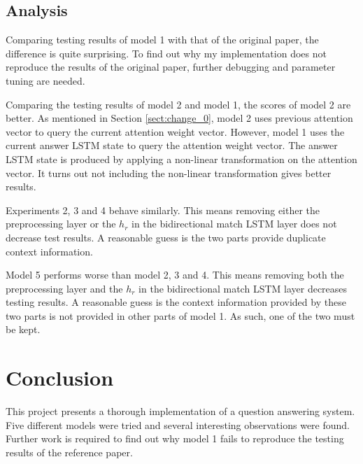 \documentclass[modernstyle,12pt]{sjsuthesis}
\theoremstyle{definition}
\begin{document}
\section{Analysis}

Comparing testing results of model 1 with that of the original paper, the difference is quite surprising. To find out why my implementation does not reproduce the results of the original paper, further debugging and parameter tuning are needed.

Comparing the testing results of model 2 and model 1, the scores of model 2 are better. As mentioned in Section \ref{sect:change_0}, model 2 uses previous attention vector to query the current attention weight vector. However, model 1 uses the current answer LSTM state to query the attention weight vector. The answer LSTM state is produced by applying a non-linear transformation on the attention vector. It turns out not including the non-linear transformation gives better results.

Experiments 2, 3 and 4 behave similarly. This means removing either the preprocessing layer or the $h_r$ in the bidirectional match LSTM layer does not decrease test results. A reasonable guess is the two parts provide duplicate context information.

Model 5 performs worse than model 2, 3 and 4. This means removing both the preprocessing layer and the $h_r$ in the bidirectional match LSTM layer decreases testing results. A reasonable guess is the context information provided by these two parts is not provided in other parts of model 1. As such, one of the two must be kept.





\chapter{Conclusion}

This project presents a thorough implementation of a question answering system. Five different models were tried and several interesting observations were found. Further work is required to find out why model 1 fails to reproduce the testing results of the reference paper.




%
%
%
\end{document}
